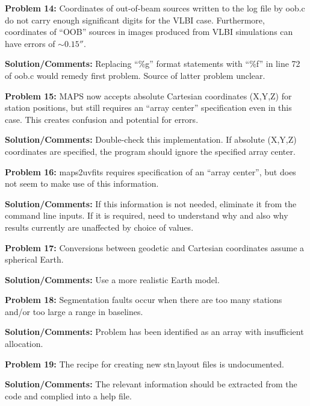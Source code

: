 \documentclass[12pt]{article}
\begin{document}
\begin{flushleft}
\bigskip

{\bf {\color{red}Problem 14:}} Coordinates of out-of-beam sources
written to the log file by oob.c do not carry enough significant
digits for the VLBI case. Furthermore, coordinates of ``OOB'' sources in
images produced from VLBI simulations can have errors of $\sim0.15''$. 

{\bf Solution/Comments:} Replacing ``\%g'' format statements with
``\%f'' in line 72 of oob.c would remedy first problem. Source of
latter problem unclear.

\bigskip

{\bf {\color{red}Problem 15:}} MAPS now accepts absolute
Cartesian coordinates (X,Y,Z) for station positions, but still requires
an ``array center'' specification even in this case. 
This creates confusion and potential for errors. 

{\bf Solution/Comments:}  Double-check this implementation. If absolute (X,Y,Z)
coordinates are specified, the program should ignore the specified
array center.

\bigskip

{\bf {\color{red}Problem 16:}} {\sf maps2uvfits} requires specification of an
``array center'', but does not seem to make use of this
information. 

{\bf Solution/Comments:}  If this information is not needed, eliminate
it from the command line inputs. If it is required, need to understand
why and also why results currently are unaffected by choice of values. 


\bigskip

{\bf {\color{red}Problem 17:}} 
Conversions between geodetic and Cartesian coordinates assume
a spherical Earth.

{\bf Solution/Comments:}  Use a more realistic Earth model.

\bigskip


{\bf {\color{red}Problem 18:}} Segmentation faults occur when there
are too many stations and/or too large a range in baselines.

{\bf Solution/Comments:} Problem has been identified as an array with
insufficient allocation.

\bigskip

{\bf {\color{red}Problem 19:}} The recipe for creating new
stn$\underline~$layout files is undocumented.

{\bf Solution/Comments:} The relevant information should be extracted
from the code and complied
into a help file.

\bigskip


\end{flushleft}
\end{document}
